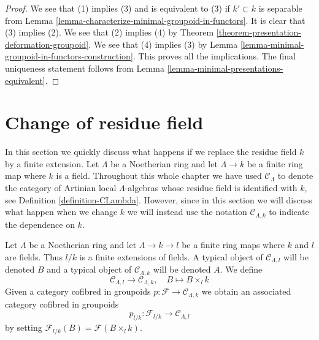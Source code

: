 \begin{proof}
We see that (1) implies (3) and is equivalent to (3) if
$k' \subset k$ is separable from
Lemma \ref{lemma-characterize-minimal-groupoid-in-functors}.
It is clear that (3) implies (2). We see that (2) implies (4) by
Theorem \ref{theorem-presentation-deformation-groupoid}.
We see that (4) implies (3) by
Lemma \ref{lemma-minimal-groupoid-in-functors-construction}.
This proves all the implications.
The final uniqueness statement follows from
Lemma \ref{lemma-minimal-presentations-equivalent}.
\end{proof}













\section{Change of residue field}
\label{section-change-of-field}

\noindent
In this section we quickly discuss what happens if we replace the residue
field $k$ by a finite extension. Let $\Lambda$ be a Noetherian ring and
let $\Lambda \to k$ be a finite ring map where $k$ is a field. Throughout
this whole chapter we have used $\mathcal{C}_\Lambda$ to denote the
category of Artinian local $\Lambda$-algebras whose residue field is
identified with $k$, see Definition \ref{definition-CLambda}.
However, since in this section we will discuss what happen when we change
$k$ we will instead use the notation $\mathcal{C}_{\Lambda, k}$ to
indicate the dependence on $k$.

\begin{situation}
\label{situation-change-of-fields}
Let $\Lambda$ be a Noetherian ring and let $\Lambda \to k \to l$ be a finite
ring maps where $k$ and $l$ are fields. Thus $l/k$ is a finite
extensions of fields. A typical object of $\mathcal{C}_{\Lambda, l}$ will be
denoted $B$ and a typical object of $\mathcal{C}_{\Lambda, k}$ will be
denoted $A$. We define
\begin{equation}
\label{equation-comparison}
\mathcal{C}_{\Lambda, l} \longrightarrow \mathcal{C}_{\Lambda, k},
\quad
B \longmapsto B \times_l k
\end{equation}
Given a category cofibred in groupoids
$p : \mathcal{F} \to \mathcal{C}_{\Lambda, k}$ we obtain
an associated category cofibred in groupoids
$$
p_{l/k} : \mathcal{F}_{l/k} \longrightarrow \mathcal{C}_{\Lambda, l}
$$
by setting $\mathcal{F}_{l/k}(B) = \mathcal{F}(B \times_l k)$.
\end{situation}

